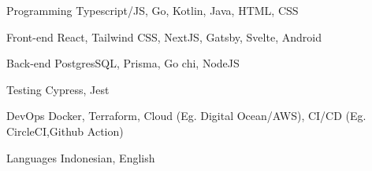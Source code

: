

\begin{cvskills}

  \cvskill
  {Programming} %
  {Typescript/JS, Go, Kotlin, Java, HTML, CSS} %

  \cvskill
  {Front-end} %
  {React, Tailwind CSS, NextJS, Gatsby, Svelte, Android} %

  \cvskill
  {Back-end} %
  {PostgresSQL, Prisma, Go chi, NodeJS} %

  \cvskill
  {Testing} %
  {Cypress, Jest} %


  \cvskill
  {DevOps} %
  {Docker, Terraform, Cloud (Eg. Digital Ocean/AWS), CI/CD (Eg. CircleCI,Github Action)} %

  \cvskill
  {Languages} %
  {Indonesian, English} %

\end{cvskills}
